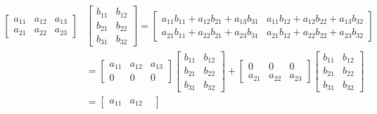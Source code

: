 \documentclass[../../main.tex]{subfiles}
\begin{document}
\begin{align*}
\begin{bmatrix}
    \scriptstyle a_{11} &
    \scriptstyle a_{12} &
    \scriptstyle a_{13} \\
    \scriptstyle a_{21} &
    \scriptstyle a_{22} &
    \scriptstyle a_{23}
\end{bmatrix}
&\begin{bmatrix}
    \scriptstyle b_{11} &
    \scriptstyle b_{12} \\
    \scriptstyle b_{21} &
    \scriptstyle b_{22} \\
    \scriptstyle b_{31} &
    \scriptstyle b_{32}
\end{bmatrix}
=
\begin{bmatrix}
    \scriptstyle a_{11} b_{11} + a_{12} b_{21} + a_{13} b_{31} &
    \scriptstyle a_{11} b_{12} + a_{12} b_{22} + a_{13} b_{32} \\
    \scriptstyle a_{21} b_{11} + a_{22} b_{21} + a_{23} b_{31} &
    \scriptstyle a_{21} b_{12} + a_{22} b_{22} + a_{23} b_{32}
\end{bmatrix} \\
&=
\begin{bmatrix}
    \scriptstyle a_{11} &
    \scriptstyle a_{12} &
    \scriptstyle a_{13} \\
    \scriptstyle 0      &
    \scriptstyle 0      &
    \scriptstyle 0
\end{bmatrix}
\begin{bmatrix}
    \scriptstyle b_{11} &
    \scriptstyle b_{12} \\
    \scriptstyle b_{21} &
    \scriptstyle b_{22} \\
    \scriptstyle b_{31} &
    \scriptstyle b_{32}
\end{bmatrix}
+
\begin{bmatrix}
    \scriptstyle 0      &
    \scriptstyle 0      &
    \scriptstyle 0 \\
    \scriptstyle a_{21} &
    \scriptstyle a_{22} &
    \scriptstyle a_{23}
\end{bmatrix}
\begin{bmatrix}
    \scriptstyle b_{11} & \scriptstyle b_{12} \\
    \scriptstyle b_{21} & \scriptstyle b_{22} \\
    \scriptstyle b_{31} & \scriptstyle b_{32}
\end{bmatrix} \\
&=
\begin{bmatrix}
    \scriptstyle a_{11} &
    \scriptstyle a_{12} &

\end{bmatrix}
\end{align*}
\end{document}
